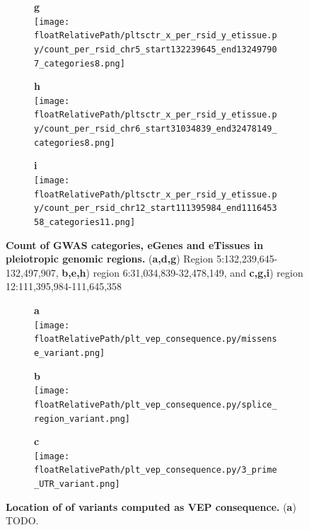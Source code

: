 \begin{figure}[!ht]
\begin{subfigure}[]{.33\textwidth}
\textbf{g}
\\
\texttt{[image: \\floatRelativePath/pltsctr\_x\_per\_rsid\_y\_etissue.py/count\_per\_rsid\_chr5\_start132239645\_end132497907\_categories8.png]}
\end{subfigure}
%
\begin{subfigure}[]{.33\textwidth}
\textbf{h}
\\
\texttt{[image: \\floatRelativePath/pltsctr\_x\_per\_rsid\_y\_etissue.py/count\_per\_rsid\_chr6\_start31034839\_end32478149\_categories8.png]}
\end{subfigure}
%
\begin{subfigure}[]{.33\textwidth}
\textbf{i}
\\
\texttt{[image: \\floatRelativePath/pltsctr\_x\_per\_rsid\_y\_etissue.py/count\_per\_rsid\_chr12\_start111395984\_end111645358\_categories11.png]}
\end{subfigure}

\caption{\textbf{Count of GWAS categories, eGenes and eTissues in pleiotropic genomic regions.} (\textbf{a,d,g}) Region 5:132,239,645-132,497,907, \textbf{b,e,h}) region 6:31,034,839-32,478,149,  and \textbf{c,g,i}) region 12:111,395,984-111,645,358} \label{fig:region_gwas_egenes_tissues}
%
\end{figure}

%
%

\begin{figure}[!]
\centering
%
\begin{subfigure}[]{.33\textwidth}
\textbf{a}
\\
\texttt{[image: \\floatRelativePath/plt\_vep\_consequence.py/missense\_variant.png]}
%
\end{subfigure}
%
\begin{subfigure}[]{.33\textwidth}
\textbf{b}
\\
\texttt{[image: \\floatRelativePath/plt\_vep\_consequence.py/splice\_region\_variant.png]}
%
\end{subfigure}
%
\begin{subfigure}[]{.33\textwidth}
\textbf{c}
\\
\texttt{[image: \\floatRelativePath/plt\_vep\_consequence.py/3\_prime\_UTR\_variant.png]}
%
\end{subfigure}
%
\caption{\textbf{Location of of variants computed as VEP consequence.} (\textbf{a}) TODO.} \label{fig:vep_consequence}
%
\end{figure}

